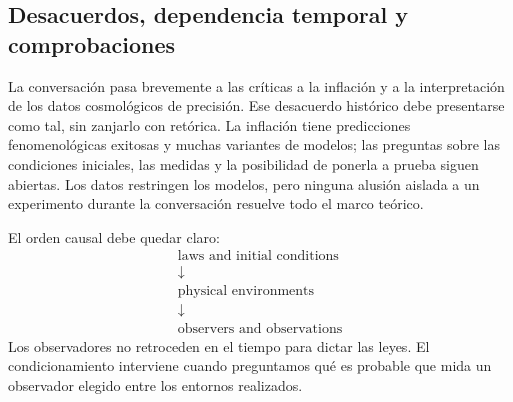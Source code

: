 \subsection{Desacuerdos, dependencia temporal y comprobaciones}

La conversación pasa brevemente a las críticas a la inflación y a la interpretación de los datos cosmológicos de precisión. Ese desacuerdo histórico debe presentarse como tal, sin zanjarlo con retórica. La inflación tiene predicciones fenomenológicas exitosas y muchas variantes de modelos; las preguntas sobre las condiciones iniciales, las medidas y la posibilidad de ponerla a prueba siguen abiertas. Los datos restringen los modelos, pero ninguna alusión aislada a un experimento durante la conversación resuelve todo el marco teórico.

\begin{classroomqa}
\end{classroomqa}

\begin{classroomqa}
\end{classroomqa}

El orden causal debe quedar claro:
\begin{equation}
\begin{gathered}
\text{laws and initial conditions}\\[-0.15em]
\downarrow\\[-0.15em]
\text{physical environments}\\[-0.15em]
\downarrow\\[-0.15em]
\text{observers and observations}
\end{gathered}
\end{equation}
Los observadores no retroceden en el tiempo para dictar las leyes. El condicionamiento interviene cuando preguntamos qué es probable que mida un observador elegido entre los entornos realizados.

